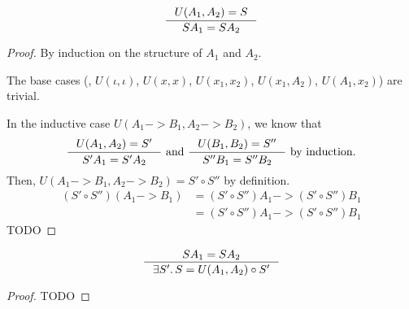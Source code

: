 \begin{theorem} \label{prop:soundU}
	\[ \inference{U(A_1,A_2)=S}{S A_1 = S A_2}\]
\end{theorem}
\begin{proof}
By induction on the structure of $A_1$ and $A_2$.

The base cases (\ie, $U(\iota,\iota)$, $U(x,x)$, $U(x_1,x_2)$,
			$U(x_1,A_2)$, $U(A_1,x_2)$) are trivial.

In the inductive case $U(A_1 -> B_1, A_2 -> B_2)$, we know that
\[ \inference{U(A_1,A_2)=S' }{S'  A_1 = S'  A_2} ~\text{and}~
   \inference{U(B_1,B_2)=S''}{S'' B_1 = S'' B_2} ~\text{by induction.}
\]
Then, $U(A_1 -> B_1, A_2 -> B_2)=S'\circ S''$ by definition.
\begin{align*}
(S'\circ S'')(A_1 -> B_1)
&= (S'\circ S'') A_1 -> (S'\circ S'') B_1 \\
&= (S'\circ S'') A_1 -> (S'\circ S'') B_1
\end{align*}
TODO


\end{proof}

\begin{theorem} \label{prop:completeU}
\[ \inference{S A_1 = S A_2}{\exists S'.\, S = U(A_1,A_2)\circ S'} \]
\end{theorem}
\begin{proof}
	TODO
\end{proof}


